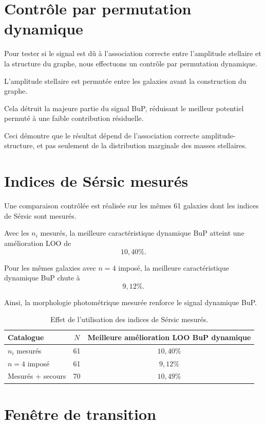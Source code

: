 \documentclass[11pt,a4paper]{article}
\begin{document}
\section{Contrôle par permutation dynamique}

Pour tester si le signal est dû à l'association correcte entre l'amplitude stellaire et la structure du graphe, nous effectuons un contrôle par permutation dynamique.

L'amplitude stellaire est permutée entre les galaxies avant la construction du graphe.

Cela détruit la majeure partie du signal BuP, réduisant le meilleur potentiel permuté à une faible contribution résiduelle.

Ceci démontre que le résultat dépend de l'association correcte amplitude-structure, et pas seulement de la distribution marginale des masses stellaires.

\section{Indices de Sérsic mesurés}

Une comparaison contrôlée est réalisée sur les mêmes 61 galaxies dont les indices de Sérsic sont mesurés.

Avec les \(n_i\) mesurés, la meilleure caractéristique dynamique BuP atteint une amélioration LOO de
\[
10,40\%.
\]

Pour les mêmes galaxies avec \(n=4\) imposé, la meilleure caractéristique dynamique BuP chute à
\[
9,12\%.
\]

Ainsi, la morphologie photométrique mesurée renforce le signal dynamique BuP.

\begin{table}[h]
\centering
\begin{tabular}{lcc}
\toprule
Catalogue & \(N\) & Meilleure amélioration LOO BuP dynamique \\
\midrule
\(n_i\) mesurés & 61 & \(10,40\%\) \\
\(n=4\) imposé & 61 & \(9,12\%\) \\
Mesurés + secours & 70 & \(10,49\%\) \\
\bottomrule
\end{tabular}
\caption{Effet de l'utilisation des indices de Sérsic mesurés.}
\end{table}

\section{Fenêtre de transition}
\end{document}
